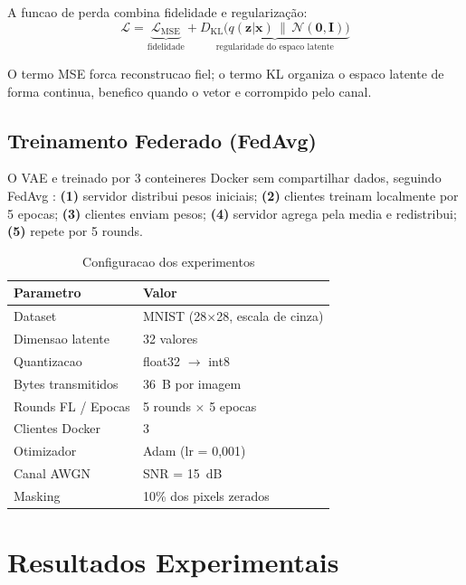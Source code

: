 \documentclass[conference]{IEEEtran}
\begin{document}
A funcao de perda combina fidelidade e regularização:
\begin{equation}
\mathcal{L} = \underbrace{\mathcal{L}_{\text{MSE}}}_{\text{fidelidade}} +
              \underbrace{D_{\text{KL}}\bigl(q(\mathbf{z}|\mathbf{x})\,\|\,
              \mathcal{N}(\mathbf{0},\mathbf{I})\bigr)}_{\text{regularidade do espaco latente}}
\end{equation}

O termo MSE forca reconstrucao fiel; o termo KL organiza o espaco latente
de forma continua, benefico quando o vetor e corrompido pelo canal.

\subsection{Treinamento Federado (FedAvg)}

O VAE e treinado por 3 conteineres Docker sem compartilhar dados,
seguindo FedAvg \cite{mcmahan2017}:
\textbf{(1)} servidor distribui pesos iniciais;
\textbf{(2)} clientes treinam localmente por 5 epocas;
\textbf{(3)} clientes enviam pesos;
\textbf{(4)} servidor agrega pela media e redistribui;
\textbf{(5)} repete por 5 rounds.

\begin{table}[ht]
\centering
\caption{Configuracao dos experimentos}
\label{tab:params}
\begin{tabular}{ll}
\toprule
\textbf{Parametro}       & \textbf{Valor} \\
\midrule
Dataset                  & MNIST (28$\times$28, escala de cinza) \\
Dimensao latente         & 32 valores \\
Quantizacao              & float32 $\rightarrow$ int8 \\
Bytes transmitidos       & 36~B por imagem \\
Rounds FL / Epocas       & 5 rounds $\times$ 5 epocas \\
Clientes Docker          & 3 \\
Otimizador               & Adam (lr = 0,001) \\
Canal AWGN               & SNR = 15~dB \\
Masking                  & 10\% dos pixels zerados \\
\bottomrule
\end{tabular}
\end{table}


\section{Resultados Experimentais}
\end{document}
